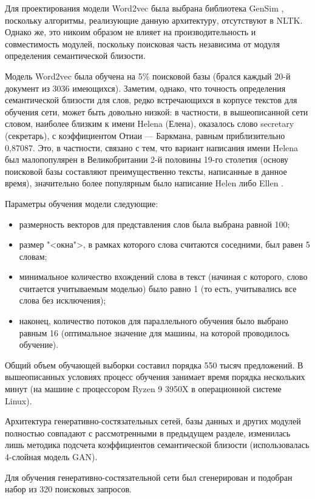 Для проектирования модели Word2vec была выбрана библиотека GenSim \cite{rehurek_lrec}, поскольку алгоритмы, реализующие
данную архитектуру, отсутствуют в NLTK. Однако же, это никоим образом не влияет на производительность и совместимость модулей,
поскольку поисковая часть независима от модуля определения семантической близости.

Модель Word2vec была обучена на 5\% поисковой базы (брался каждый 20-й документ из 3036 имеющихся). Заметим, однако, что точность
определения семантической близости для слов, редко встречающихся в корпусе текстов для обучения сети, может быть довольно низкой:
в частности, в вышеописанной сети словом, наиболее близким к имени Helena (Елена), оказалось слово secretary (секретарь), с коэффициентом
Отиаи --- Баркмана, равным приблизительно 0,87087. Это, в частности, связано с тем, что вариант написания имени Helena был малопопулярен
в Великобритании 2-й половины 19-го столетия (основу поисковой базы составляют преимущественно тексты, написанные в данное время),
значительно более популярным было написание Helen либо Ellen \cite{helen1850, helen1900}.

Параметры обучения модели следующие:
\begin{itemize}
    \item размерность векторов для представления слов была выбрана равной 100;
    \item размер "<окна">, в рамках которого слова считаются соседними, был равен 5 словам;
    \item минимальное количество вхождений слова в текст (начиная с которого, слово считается учитываемым моделью) было равно 1 
          (то есть, учитывались все слова без исключения);
    \item наконец, количество потоков для параллельного обучения было выбрано равным 16 (оптимальное значение для машины, 
          на которой проводилось обучение).
\end{itemize}

Общий объем обучающей выборки составил порядка 550 тысяч предложений. В вышеописанных условиях процесс обучения занимает
время порядка нескольких минут (на машине с процессором Ryzen 9 3950X в операционной системе Linux).

Архитектура генеративно-состязательных сетей, базы данных и других модулей полностью совпадают с рассмотренными в предыдущем разделе,
изменилась лишь методика подсчета коэффициентов семантической близости (использовалась 4-слойная модель GAN).

Для обучения генеративно-состязательной сети был сгенерирован и подобран набор из 320 поисковых запросов.

